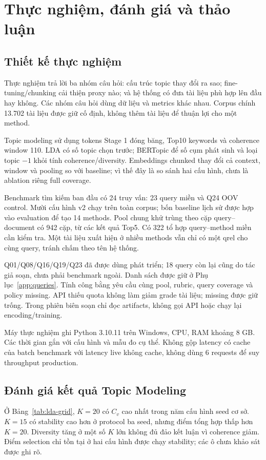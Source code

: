 \chapter{Thực nghiệm, đánh giá và thảo luận}\label{ch:experiments}
\section{Thiết kế thực nghiệm}
Thực nghiệm trả lời ba nhóm câu hỏi: cấu trúc topic thay đổi ra sao; fine-tuning/chunking cải thiện proxy nào; và hệ thống có đưa tài liệu phù hợp lên đầu hay không. Các nhóm câu hỏi dùng dữ liệu và metrics khác nhau. Corpus chính 13.702 tài liệu được giữ cố định, không thêm tài liệu để thuận lợi cho một method.

Topic modeling sử dụng tokens Stage 1 đóng băng, Top10 keywords và coherence window 110. LDA có số topic chọn trước; BERTopic để số cụm phát sinh và loại topic $-1$ khỏi tính coherence/diversity. Embeddings chunked thay đổi cả context, window và pooling so với baseline; vì thế đây là so sánh hai cấu hình, chưa là ablation riêng full coverage.

Benchmark tìm kiếm ban đầu có 24 truy vấn: 23 query miền và Q24 OOV control. Mười cấu hình v2 chạy trên toàn corpus; bốn baseline lịch sử được hợp vào evaluation để tạo 14 methods. Pool chung khử trùng theo cặp query--document có 942 cặp, từ các kết quả Top5. Có 322 tổ hợp query--method miền cần kiểm tra. Một tài liệu xuất hiện ở nhiều methods vẫn chỉ có một qrel cho cùng query, tránh chấm theo tên hệ thống.

Q01/Q08/Q16/Q19/Q23 đã được dùng phát triển; 18 query còn lại cũng do tác giả soạn, chưa phải benchmark ngoài. Danh sách được giữ ở Phụ lục~\ref{app:queries}. Tính công bằng yêu cầu cùng pool, rubric, query coverage và policy missing. API thiếu quota không làm giảm grade tài liệu; missing được giữ trống. Trong phiên biên soạn chỉ đọc artifacts, không gọi API hoặc chạy lại encoding/training.

Máy thực nghiệm ghi Python 3.10.11 trên Windows, CPU, RAM khoảng 8 GB. Các thời gian gắn với cấu hình và mẫu đo cụ thể. Không gộp latency có cache của batch benchmark với latency live không cache, không dùng 6 requests để suy throughput production.

\section{Đánh giá kết quả Topic Modeling}

Ở Bảng~\ref{tab:lda-grid}, $K=20$ có $C_v$ cao nhất trong năm cấu hình seed cơ sở. $K=15$ có stability cao hơn ở protocol ba seed, nhưng điểm tổng hợp thấp hơn $K=20$. Diversity tăng ở một số $K$ lớn không đủ đảo kết luận vì coherence giảm. Điểm selection chỉ tồn tại ở hai cấu hình được chạy stability; các ô chưa khảo sát được ghi rõ.

